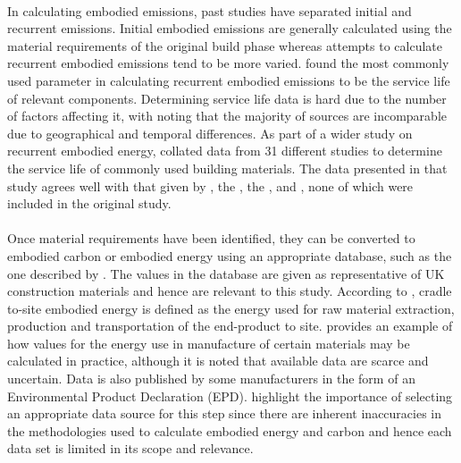 \documentclass[12pt]{article}
\begin{document}
\paragraph{}
In calculating embodied emissions, past studies have separated initial and recurrent emissions. Initial embodied emissions are generally calculated using the material requirements of the original build phase whereas attempts to calculate recurrent embodied emissions tend to be more varied. \citet{Dixit2019-bj} found the most commonly used parameter in calculating recurrent embodied emissions to be the service life of relevant components. Determining service life data is hard due to the number of factors affecting it, with \citet{Grant2013-oq} noting that the majority of sources are incomparable due to geographical and temporal differences. As part of a wider study on recurrent embodied energy, \citet{Dixit2019-bj} collated data from 31 different studies to determine the service life of commonly used building materials. The data presented in that study agrees well with that given by \citet{Beobachter_undated-vh}, the \citet{Carbon_Leadership_Forum2018-iq}, the \citet{Royal_Institution_of_Chartered_Surveyors2017-si}, \citet{InterNACHI2019-ae} and \citet{Fannie_Mae2014-ne}, none of which were included in the original study.

\paragraph{}
Once material requirements have been identified, they can be converted to embodied carbon or embodied energy using an appropriate database, such as the one described by \citet{Hammond2008-np}. The values in the database are given as representative of UK construction materials and hence are relevant to this study. According to \citet{Christoforou2016-ye}, cradle to-site embodied energy is defined as the energy used for raw material extraction, production and transportation of the end-product to site. \citet{Hallquist1978-kf} provides an example of how values for the energy use in manufacture of certain materials may be calculated in practice, although it is noted that available data are scarce and uncertain. Data is also published by some manufacturers in the form of an Environmental Product Declaration (EPD). \citet{Moncaster2012-xm} highlight the importance of selecting an appropriate data source for this step since there are inherent inaccuracies in the methodologies used to calculate embodied energy and carbon and hence each data set is limited in its scope and relevance.
\end{document}
